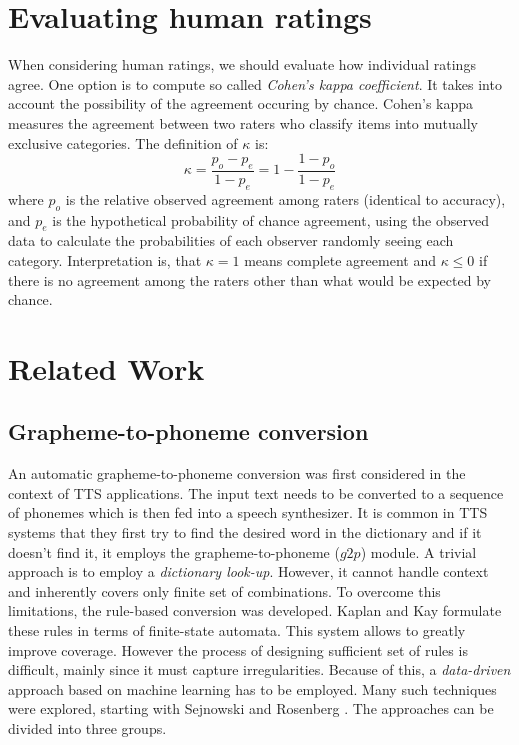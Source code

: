 \section{Evaluating human ratings}
When considering human ratings, we should evaluate how individual ratings agree.
One option is to compute so called \textit{Cohen's kappa coefficient}\cite{cohen1968weighted}.
It takes into account the possibility of the agreement occuring by chance.
Cohen's kappa measures the agreement between two raters who classify items into mutually exclusive categories.
The definition of $\kappa$ is:
\begin{equation}
\kappa = \frac {p_{o}-p_{e}}{1-p_{e}}=1-\frac {1-p_{o}}{1-p_{e}}
\end{equation}
where $p_o$ is the relative observed agreement among raters (identical to accuracy), and $p_e$ is the hypothetical probability of chance agreement, using the observed data to calculate the probabilities of each observer randomly seeing each category.
Interpretation is, that $\kappa = 1$ means complete agreement and $\kappa \leq 0$ if there is no agreement among the raters other than what would be expected by chance. 
\pagebreak
\section{Related Work}
\label{relatedwork}
\subsection{Grapheme-to-phoneme conversion}
An automatic grapheme-to-phoneme conversion was first considered in the context of TTS applications. The input text needs to be converted to a sequence of phonemes which is then fed into a speech synthesizer.
It is common in TTS systems that they first try to find the desired word in the dictionary and if it doesn't find it, it employs the grapheme-to-phoneme ($g2p$) module.
A trivial approach is to employ a \textit{dictionary look-up}.
However, it cannot handle context and inherently covers only finite set of combinations.
To overcome this limitations, the rule-based conversion was developed.
Kaplan and Kay \cite{kaplan1994regular} formulate these rules in terms of finite-state automata.
This system allows to greatly improve coverage.
However the process of designing sufficient set of rules is difficult, mainly since it must capture irregularities.
Because of this, a \textit{data-driven} approach based on machine learning has to be employed.
Many such techniques were explored, starting with Sejnowski and Rosenberg \cite{sejnowski1988nettalk}.
The approaches can be divided into three groups.
